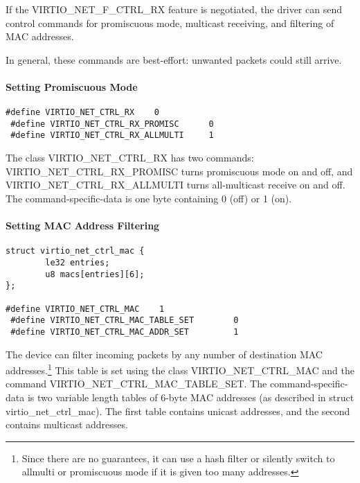If the VIRTIO_NET_F_CTRL_RX feature is negotiated, the driver can
send control commands for promiscuous mode, multicast receiving,
and filtering of MAC addresses.

\begin{note}
In general, these commands are best-effort: unwanted
packets could still arrive.
\end{note}

\paragraph{Setting Promiscuous Mode}\label{sec:Device Types / Network Device / Device Operation / Control Virtqueue / Setting Promiscuous Mode}

\begin{lstlisting}
#define VIRTIO_NET_CTRL_RX    0
 #define VIRTIO_NET_CTRL_RX_PROMISC      0
 #define VIRTIO_NET_CTRL_RX_ALLMULTI     1
\end{lstlisting}

The class VIRTIO_NET_CTRL_RX has two commands:
VIRTIO_NET_CTRL_RX_PROMISC turns promiscuous mode on and off, and
VIRTIO_NET_CTRL_RX_ALLMULTI turns all-multicast receive on and
off. The command-specific-data is one byte containing 0 (off) or
1 (on).

\paragraph{Setting MAC Address Filtering}\label{sec:Device Types / Network Device / Device Operation / Control Virtqueue / Setting MAC Address Filtering}

\begin{lstlisting}
struct virtio_net_ctrl_mac {
        le32 entries;
        u8 macs[entries][6];
};

#define VIRTIO_NET_CTRL_MAC    1
 #define VIRTIO_NET_CTRL_MAC_TABLE_SET        0
 #define VIRTIO_NET_CTRL_MAC_ADDR_SET         1
\end{lstlisting}

The device can filter incoming packets by any number of destination
MAC addresses.\footnote{Since there are no guarantees, it can use a hash filter or
silently switch to allmulti or promiscuous mode if it is given too
many addresses.
} This table is set using the class
VIRTIO_NET_CTRL_MAC and the command VIRTIO_NET_CTRL_MAC_TABLE_SET. The
command-specific-data is two variable length tables of 6-byte MAC
addresses (as described in struct virtio_net_ctrl_mac). The first table contains unicast addresses, and the second
contains multicast addresses.

